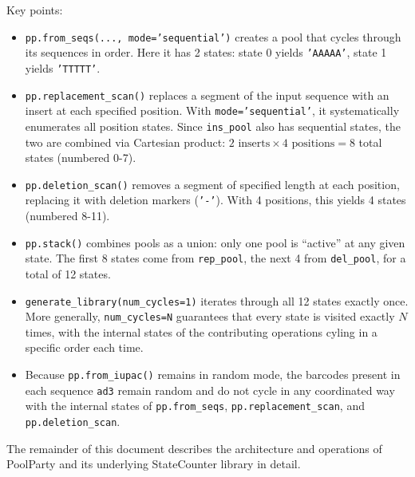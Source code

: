 \documentclass[11pt]{article}
\newcommand{\inpy}[1]{\texttt{#1}}
\begin{document}
Key points:
\begin{itemize}
    \item \inpy{pp.from_seqs(..., mode='sequential')} creates a pool that cycles through its sequences in order. Here it has 2 states: state 0 yields \inpy{'AAAAA'}, state 1 yields \inpy{'TTTTT'}.
    
    \item \inpy{pp.replacement_scan()} replaces a segment of the input sequence with an insert at each specified position. With \inpy{mode='sequential'}, it systematically enumerates all position states. Since \inpy{ins_pool} also has sequential states, the two are combined via Cartesian product: $2 \text{ inserts} \times 4 \text{ positions} = 8$ total states (numbered 0-7).
     
    \item \inpy{pp.deletion_scan()} removes a segment of specified length at each position, replacing it with deletion markers (\inpy{'-'}). With 4 positions, this yields 4 states (numbered 8-11).
    
    \item \inpy{pp.stack()} combines pools as a union: only one pool is ``active'' at any given state. The first 8 states come from \inpy{rep_pool}, the next 4 from \inpy{del_pool}, for a total of 12 states.

    \item \inpy{generate_library(num_cycles=1)} iterates through all 12 states exactly once. More generally, \inpy{num_cycles=N} guarantees that every state is visited exactly $N$ times, with the internal states of the contributing operations cyling in a specific order each time.
    
    \item Because \inpy{pp.from_iupac()} remains in random mode, the barcodes present in each sequence \inpy{ad3} remain random and do not cycle in any coordinated way with the internal states of \inpy{pp.from_seqs}, \inpy{pp.replacement_scan}, and \inpy{pp.deletion_scan}.
\end{itemize}

\medskip
\noindent The remainder of this document describes the architecture and operations of 
PoolParty and its underlying StateCounter library in detail.
\newpage


\end{document}
